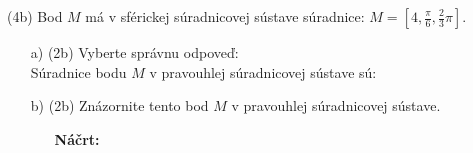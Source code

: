 \pr (4b) Bod $M$ má v sférickej súradnicovej sústave súradnice: $\displaystyle M=\left[4,\frac{\pi}{6}, \frac{2}{3}\pi\right]$.

\begin{enumerate}
\item[a)] (2b) Vyberte správnu odpoveď:\\
Súradnice bodu $M$ v pravouhlej súradnicovej sústave sú:


\noindent
\begin{itemize}
\end{itemize}


\item[b)] (2b) Znázornite tento bod $M$ v pravouhlej súradnicovej sústave.

\begin{enumerate}
\item[]\textbf{Náčrt:}
\end{enumerate}
\end{enumerate}

\newpage

\bigskip
